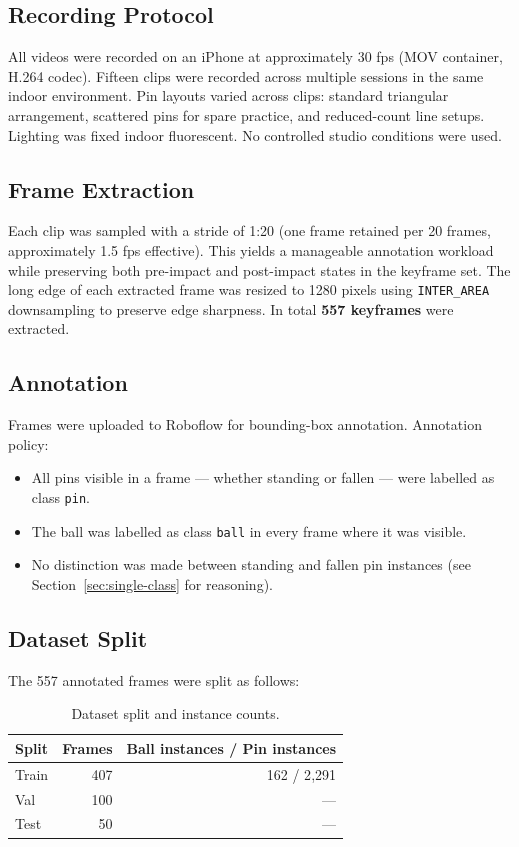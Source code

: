\documentclass[11pt,a4paper]{article}
\begin{document}
\subsection{Recording Protocol}
\label{sec:recording}

All videos were recorded on an iPhone at approximately 30 fps (MOV container, H.264 codec). Fifteen clips were recorded across multiple sessions in the same indoor environment. Pin layouts varied across clips: standard triangular arrangement, scattered pins for spare practice, and reduced-count line setups. Lighting was fixed indoor fluorescent. No controlled studio conditions were used.

\subsection{Frame Extraction}

Each clip was sampled with a stride of 1:20 (one frame retained per 20 frames, approximately 1.5 fps effective). This yields a manageable annotation workload while preserving both pre-impact and post-impact states in the keyframe set. The long edge of each extracted frame was resized to 1280 pixels using \texttt{INTER\_AREA} downsampling to preserve edge sharpness. In total \textbf{557 keyframes} were extracted.

\subsection{Annotation}

Frames were uploaded to Roboflow for bounding-box annotation. Annotation policy:
\begin{itemize}
  \item All pins visible in a frame --- whether standing or fallen --- were labelled as class \texttt{pin}.
  \item The ball was labelled as class \texttt{ball} in every frame where it was visible.
  \item No distinction was made between standing and fallen pin instances (see Section~\ref{sec:single-class} for reasoning).
\end{itemize}

\subsection{Dataset Split}

The 557 annotated frames were split as follows:

\begin{table}[H]
\centering
\caption{Dataset split and instance counts.}
\label{tab:split}
\begin{tabular}{lrr}
\toprule
Split & Frames & Ball instances / Pin instances \\
\midrule
Train & 407 & 162 / 2{,}291 \\
Val   & 100 & --- \\
Test  &  50 & --- \\
\bottomrule
\end{tabular}
\end{table}
\end{document}
